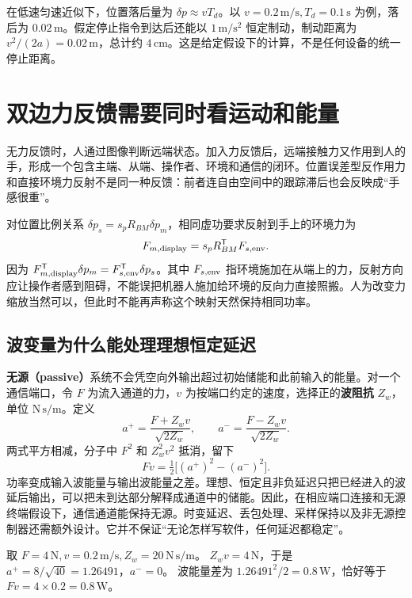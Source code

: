 在低速匀速近似下，位置落后量为 $\delta p\approx vT_d$。以 $v=0.2\,\mathrm{m/s},T_d=0.1\,\mathrm s$ 为例，落后为 $0.02\,\mathrm m$。假定停止指令到达后还能以 $1\,\mathrm{m/s^2}$ 恒定制动，制动距离为 $v^2/(2a)=0.02\,\mathrm m$，总计约 $4\,\mathrm{cm}$。这是给定假设下的计算，不是任何设备的统一停止距离。

\section{双边力反馈需要同时看运动和能量}

无力反馈时，人通过图像判断远端状态。加入力反馈后，远端接触力又作用到人的手，形成一个包含主端、从端、操作者、环境和通信的闭环。位置误差型反作用力和直接环境力反射不是同一种反馈：前者连自由空间中的跟踪滞后也会反映成“手感很重”。

对位置比例关系 $\delta p_s=s_pR_{BM}\delta p_m$，相同虚功要求反射到手上的环境力为
\begin{equation}
F_{m,\rm display}=s_pR_{BM}^{\mathsf T}F_{s,\rm env}.
\end{equation}
因为 $F_{m,\rm display}^{\mathsf T}\delta p_m=F_{s,\rm env}^{\mathsf T}\delta p_s$。其中 $F_{s,\rm env}$ 指环境施加在从端上的力，反射方向应让操作者感到阻碍，不能误把机器人施加给环境的反向力直接照搬。人为改变力缩放当然可以，但此时不能再声称这个映射天然保持相同功率。

\subsection{波变量为什么能处理理想恒定延迟}

\textbf{无源（passive）}系统不会凭空向外输出超过初始储能和此前输入的能量。对一个通信端口，令 $F$ 为流入通道的力，$v$ 为按端口约定的速度，选择正的\textbf{波阻抗} $Z_w$，单位 $\mathrm{N\,s/m}$。定义
\begin{equation}
a^+=\frac{F+Z_wv}{\sqrt{2Z_w}},\qquad
a^-=\frac{F-Z_wv}{\sqrt{2Z_w}}.
\end{equation}
两式平方相减，分子中 $F^2$ 和 $Z_w^2v^2$ 抵消，留下
\begin{equation}
Fv=\tfrac12\big[(a^+)^2-(a^-)^2\big].
\end{equation}
功率变成输入波能量与输出波能量之差。理想、恒定且非负延迟只把已经进入的波延后输出，可以把未到达部分解释成通道中的储能。因此，在相应端口连接和无源终端假设下，通信通道能保持无源。时变延迟、丢包处理、采样保持以及非无源控制器还需额外设计。它并不保证“无论怎样写软件，任何延迟都稳定”。\cite{niemeyer}

\begin{examplebox}[验证功率恒等式]
取 $F=4\,\mathrm N,v=0.2\,\mathrm{m/s},Z_w=20\,\mathrm{N\,s/m}$。
$Z_wv=4\,\mathrm N$，于是 $a^+=8/\sqrt{40}=1.26491$，$a^-=0$。
波能量差为 $1.26491^2/2=0.8\,\mathrm W$，恰好等于 $Fv=4\times0.2=0.8\,\mathrm W$。
\end{examplebox}

